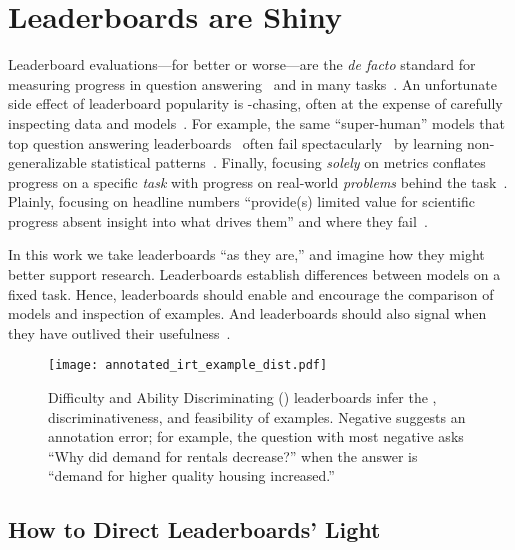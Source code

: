 \section{Leaderboards are Shiny}
\label{ch:isicle:intro}

Leaderboard evaluations---for better or worse---are the
\textit{de facto} standard for measuring progress in question
answering~\citep{squad16} and in many \nlp{}
tasks~\citep{wang2019superglue}.
An unfortunate side effect of leaderboard popularity is -chasing, often at the expense of carefully inspecting data and models~\citep{linzen2020progress}.
For example, the same  ``super-human'' models that top question answering leaderboards~\citep{najberg-18} often fail spectacularly~\citep{feng2018rawr,wallace2019universal} by learning non-generalizable statistical patterns~\citep{mccoy2019heuristics,niven2019probing}.
Finally, focusing \textit{solely} on metrics conflates progress on a specific \emph{task} with progress on real-world \nlp{} \emph{problems} behind the task~\citep{bender2020climbing}.
Plainly, focusing on headline  numbers ``provide(s) limited value for scientific progress absent insight into what drives them'' and where they fail~\citep{lipton2019troubling}.

In this work we take leaderboards ``as they are,'' and imagine how they
might better support research.
Leaderboards establish differences between
models on a fixed task.
Hence, leaderboards should enable and encourage the comparison of models and
inspection of examples.
And leaderboards should also signal when they have outlived their usefulness~\citep{boydgraber2020nerds}.

\begin{figure}[t]
  \centering
  \texttt{[image: annotated\_irt\_example\_dist.pdf]}
  \caption{
    Difficulty and Ability Discriminating (\name{}) leaderboards infer the \diff{}, discriminativeness, and feasibility of examples.
    Negative \discability{} suggests an annotation error; for example, the question with most negative \discability{}
    asks ``Why did demand for rentals decrease?'' when the answer is ``demand for higher quality housing increased.''
  }
  \label{fig:irt-dist}
\end{figure}

\subsection{How to Direct Leaderboards' Light}

